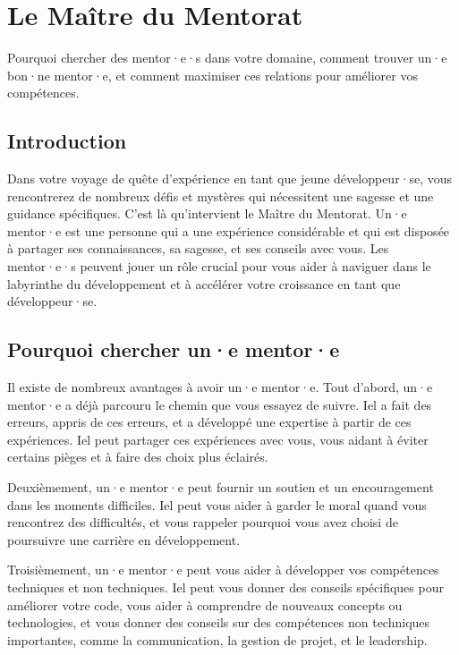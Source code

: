 \chapter{Le Maître du Mentorat}

Pourquoi chercher des mentor·e·s dans votre domaine, comment trouver un·e bon·ne mentor·e, et comment maximiser ces relations pour améliorer vos compétences.

\section{Introduction}

Dans votre voyage de quête d'expérience en tant que jeune développeur·se, vous rencontrerez de nombreux défis et mystères qui nécessitent une sagesse et une guidance spécifiques. C'est là qu'intervient le Maître du Mentorat. Un·e mentor·e est une personne qui a une expérience considérable et qui est disposée à partager ses connaissances, sa sagesse, et ses conseils avec vous. Les mentor·e·s peuvent jouer un rôle crucial pour vous aider à naviguer dans le labyrinthe du développement et à accélérer votre croissance en tant que développeur·se.

\section{Pourquoi chercher un·e mentor·e}

Il existe de nombreux avantages à avoir un·e mentor·e. Tout d'abord, un·e mentor·e a déjà parcouru le chemin que vous essayez de suivre. Iel a fait des erreurs, appris de ces erreurs, et a développé une expertise à partir de ces expériences. Iel peut partager ces expériences avec vous, vous aidant à éviter certains pièges et à faire des choix plus éclairés.

Deuxièmement, un·e mentor·e peut fournir un soutien et un encouragement dans les moments difficiles. Iel peut vous aider à garder le moral quand vous rencontrez des difficultés, et vous rappeler pourquoi vous avez choisi de poursuivre une carrière en développement.

Troisièmement, un·e mentor·e peut vous aider à développer vos compétences techniques et non techniques. Iel peut vous donner des conseils spécifiques pour améliorer votre code, vous aider à comprendre de nouveaux concepts ou technologies, et vous donner des conseils sur des compétences non techniques importantes, comme la communication, la gestion de projet, et le leadership.

